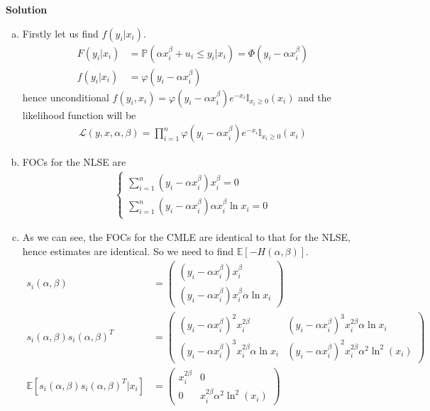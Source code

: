 \documentclass[a4paper]{article}
\newcommand{\prob}{\mathbb{P}}
\newcommand{\expect}{\mathbb{E}}
\newcommand{\summa}{\sum_{i=1}^n}
\begin{document}
\textbf{Solution}


\begin{enumerate}[(a)]
	\item Firstly let us find $f(y_i|x_i)$.
	\begin{align*}
	F(y_i|x_i) &= \prob(\alpha x_i^{\beta} + u_i \le y_i|x_i) = \Phi(y_i - \alpha x_i^{\beta})\\
	f(y_i|x_i) &= \varphi(y_i - \alpha x_i^{\beta})
	\end{align*}
	hence unconditional $f(y_i, x_i) = \varphi(y_i - \alpha x_i^{\beta}) e^{-x_i} \mathbb{I}_{x_i \ge 0}(x_i)$
	and the likelihood function will be
	\begin{align*}
	\mathcal{L}(y, x, \alpha, \beta) = \prod_{i=1}^n \varphi(y_i - \alpha x_i^{\beta})e^{-x_i}\mathbb{I}_{x_i \ge 0}(x_i)
	\end{align*}
	\item FOCs for the NLSE are
	\begin{align*}
	\begin{cases}
	\summa (y_i - \alpha x_i^{\beta})x_i^{\beta} = 0\\
	\summa (y_i - \alpha x_i^{\beta})\alpha x_i^{\beta} \ln x_i = 0
	\end{cases}
	\end{align*}
	\item As we can see, the FOCs for the CMLE are identical to that for the NLSE, hence estimates are identical. So we need to find $\expect[-H(\alpha, \beta)]$.
	\begin{align*}
	s_i(\alpha, \beta) &= \begin{pmatrix}
	(y_i - \alpha x_i^{\beta})x_i^{\beta}\\
	(y_i - \alpha x_i^{\beta})x_i^{\beta} \alpha \ln x_i
	\end{pmatrix}\\
	s_i(\alpha, \beta)s_i(\alpha, \beta)^T &= \begin{pmatrix}
	(y_i - \alpha x_i^{\beta})^2x_i^{2\beta} & (y_i - \alpha x_i^{\beta})^3 x_i^{2\beta}\alpha \ln x_i\\
	(y_i - \alpha x_i^{\beta})^3 x_i^{2\beta}\alpha \ln x_i & (y_i - \alpha x_i^{\beta})^2x_i^{2\beta}\alpha^2\ln^2(x_i)
	\end{pmatrix}\\
	\expect[s_i(\alpha, \beta)s_i(\alpha, \beta)^T|x_i] &= \begin{pmatrix}
	x_i^{2\beta} & 0\\
	0 & x_i^{2\beta}\alpha^2 \ln^2(x_i)
	\end{pmatrix}\\

\end{align*}
\end{enumerate}
\end{document}
